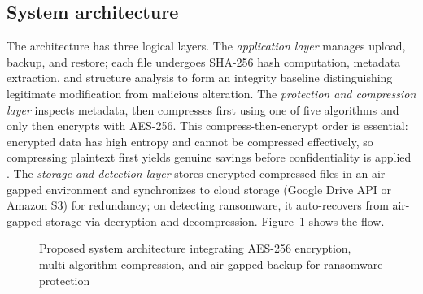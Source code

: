 \documentclass{iaesarticle}
\begin{document}
\subsection{System architecture}
The architecture has three logical layers. The \emph{application layer} manages upload, backup, and restore; each file undergoes SHA-256 hash computation, metadata extraction, and structure analysis to form an integrity baseline distinguishing legitimate modification from malicious alteration. The \emph{protection and compression layer} inspects metadata, then compresses first using one of five algorithms and only then encrypts with AES-256. This compress-then-encrypt order is essential: encrypted data has high entropy and cannot be compressed effectively, so compressing plaintext first yields genuine savings before confidentiality is applied \cite{9}. The \emph{storage and detection layer} stores encrypted-compressed files in an air-gapped environment and synchronizes to cloud storage (Google Drive API or Amazon S3) for redundancy; on detecting ransomware, it auto-recovers from air-gapped storage via decryption and decompression. Figure~\ref{fig:architecture} shows the flow.

\begin{figure}[htbp]
\centering
{}
\vspace{.5em}
\caption{Proposed system architecture integrating AES-256 encryption, multi-algorithm compression, and air-gapped backup for ransomware protection}
\label{fig:architecture}
\end{figure}
\end{document}

